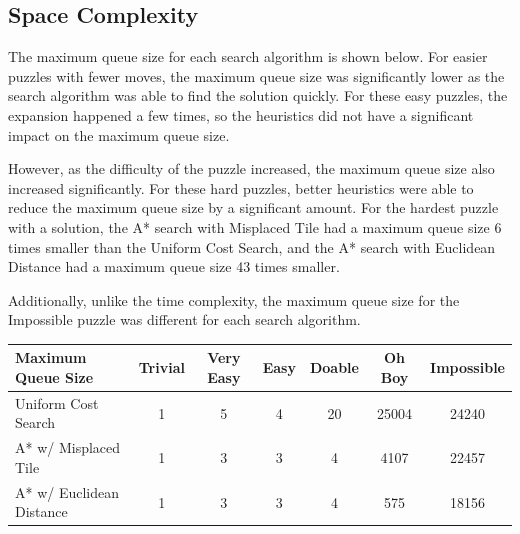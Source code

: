 \documentclass[12pt, english]{article}
\begin{document}
    \begin{center}
    \end{center}

    \subsection{Space Complexity}

    The maximum queue size for each search algorithm is shown below.
    For easier puzzles with fewer moves, the maximum queue size was significantly lower
    as the search algorithm was able to find the solution quickly.
    For these easy puzzles, the expansion happened a few times, so the heuristics did
    not have a significant impact on the maximum queue size.

    However, as the difficulty of the puzzle increased, the maximum queue size also increased
    significantly. For these hard puzzles, better heuristics were able to reduce the maximum
    queue size by a significant amount. For the hardest puzzle with a solution, the A* search
    with Misplaced Tile had a maximum queue size 6 times smaller than the Uniform Cost Search,
    and the A* search with Euclidean Distance had a maximum queue size 43 times smaller.

    Additionally, unlike the time complexity, the maximum queue size for the Impossible puzzle
    was different for each search algorithm.

    \begin{center}
        \begin{tabular}{|l|c|c|c|c|c|c|}
            \hline
            Maximum Queue Size & Trivial & Very Easy & Easy & Doable & Oh Boy & Impossible \\
            \hline
            Uniform Cost Search & 1 & 5 & 4 & 20 & 25004 & 24240 \\
            A* w/ Misplaced Tile & 1 & 3 & 3 & 4 & 4107 & 22457 \\
            A* w/ Euclidean Distance & 1 & 3 & 3 & 4 & 575 & 18156 \\
            \hline
        \end{tabular}
    \end{center}
\end{document}
